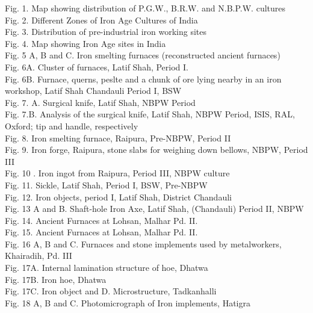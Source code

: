 \begin{myquote}

Fig. 1. Map showing distribution of P.G.W., B.R.W. and N.B.P.W. cultures\\[.2cm]
Fig. 2. Different Zones of Iron Age Cultures of India \\[.2cm]
Fig. 3. Distribution of pre-industrial iron working sites\\[.2cm]
Fig. 4. Map showing Iron Age sites in India\\[.2cm]
Fig. 5 A, B and C. Iron smelting furnaces (reconstructed ancient furnaces)\\[.2cm]
Fig. 6A.  Cluster of furnaces, Latif Shah, Period I. \\[.2cm]
Fig. 6B.  Furnace, querns, peslte and a chunk of ore lying nearby in an iron workshop, Latif Shah Chandauli Period I, BSW\\[.2cm]
Fig. 7. A. Surgical knife, Latif Shah, NBPW Period\\[.2cm]
Fig. 7.B. Analysis of the surgical knife, Latif Shah, NBPW Period, ISIS, RAL, Oxford; tip and handle, respectively\\[.2cm]
Fig. 8. Iron smelting furnace, Raipura, Pre-NBPW, Period II\\[.2cm]
Fig. 9. Iron forge, Raipura, stone slabs for weighing down bellows, NBPW, Period III \\[.2cm]
Fig. 10 . Iron ingot from Raipura, Period III, NBPW culture\\[.2cm]
Fig. 11. Sickle, Latif Shah, Period I, BSW, Pre-NBPW\\[.2cm]
Fig. 12. Iron  objects, period I, Latif Shah, District Chandauli \\[.2cm]
Fig. 13 A and B. Shaft-hole Iron Axe, Latif Shah, (Chandauli) Period II, NBPW\\[.2cm]
Fig. 14. Ancient Furnaces at Lohsan, Malhar Pd. II.\\[.2cm]
Fig. 15. Ancient Furnaces at Lohsan, Malhar Pd. II.\\[.2cm]
Fig. 16 A, B and C. Furnaces and stone implements used by metalworkers, Khairadih, Pd. III\\[.2cm]
Fig. 17A. Internal lamination structure of hoe, Dhatwa\\[.2cm] 
Fig. 17B. Iron  hoe, Dhatwa \\[.2cm]
Fig. 17C. Iron object and D. Microstructure, Tadkanhalli \\[.2cm]
Fig. 18 A, B and C. Photomicrograph of Iron implements, Hatigra \\[.2cm]

\end{myquote}
